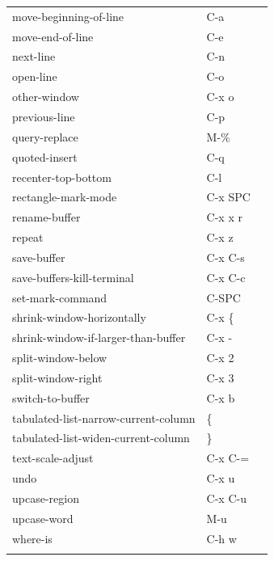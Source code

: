 \documentclass[11pt]{article}
\begin{document}
\begin{center}
\begin{tabular}{lll}
move-beginning-of-line & C-a & \\
move-end-of-line & C-e & \\
next-line & C-n & \\
open-line & C-o & \\
other-window & C-x o & \\
previous-line & C-p & \\
query-replace & M-\% & \\
quoted-insert & C-q & \\
recenter-top-bottom & C-l & \\
rectangle-mark-mode & C-x SPC & \\
rename-buffer & C-x x r & \\
repeat & C-x z & \\
save-buffer & C-x C-s & \\
save-buffers-kill-terminal & C-x C-c & \\
set-mark-command & C-SPC & \\
shrink-window-horizontally & C-x \{ & \\
shrink-window-if-larger-than-buffer & C-x - & \\
split-window-below & C-x 2 & \\
split-window-right & C-x 3 & \\
switch-to-buffer & C-x b & \\
tabulated-list-narrow-current-column & \{ & \\
tabulated-list-widen-current-column & \} & \\
text-scale-adjust & C-x C-= & \\
undo & C-x u & \\
upcase-region & C-x C-u & \\
upcase-word & M-u & \\
where-is & C-h w & \\
 &  & \\
\end{tabular}
\end{center}
\end{document}
